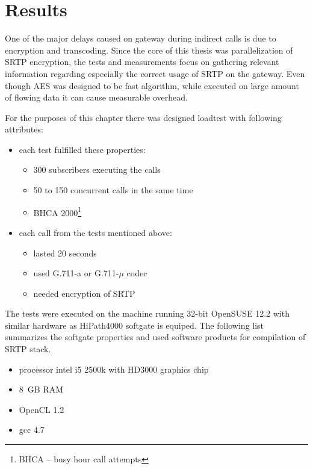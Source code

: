 \chapter{Results}\label{chapter:results}
One of the major delays caused on gateway during indirect calls is due to
encryption and transcoding. Since the core of this thesis was parallelization
of SRTP encryption, the tests and measurements focus on gathering relevant
information regarding especially the correct usage of SRTP on the gateway. Even
though AES was designed to be fast algorithm, while executed on large amount of
flowing data it can cause measurable overhead.

For the purposes of this chapter there was designed loadtest with following
attributes:
\begin{itemize}
\item each test fulfilled these properties:
\vspace{-0.5em}
\begin{itemize}
\item 300 subscribers executing the calls
\item 50 to 150 concurrent calls in the same time\cite{hp4k}
\item BHCA 2000\footnote{ BHCA -- busy hour call attempts}
\end{itemize}
\item each call from the tests mentioned above:
\vspace{-0.5em}
\begin{itemize}
\item lasted 20 seconds
\item used G.711-a or G.711-$\mu$ codec
\item needed encryption of SRTP
\end{itemize}
\end{itemize}


The tests were executed on the machine running 32-bit OpenSUSE 12.2 with similar
hardware as HiPath4000 softgate is equiped. The following list summarizes the
softgate properties and used software products for compilation of SRTP stack.
\begin{itemize}
\item processor intel i5 2500k with HD3000 graphics chip
\item 8~GB RAM
\item OpenCL 1.2
\item gcc 4.7
\end{itemize}
 
